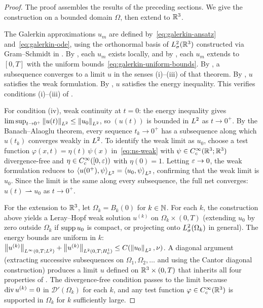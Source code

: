 \begin{proof}
  The proof assembles the results of the preceding sections.  We give the construction
  on a bounded domain $\Omega$, then extend to $\mathbb{R}^{3}$.

  The Galerkin approximations $u_{m}$ are defined by~\eqref{eq:galerkin-ansatz}
  and~\eqref{eq:galerkin-ode}, using the orthonormal basis of $L^{2}_\sigma(\mathbb{R}^{3})$
  constructed via Gram--Schmidt in .  By
  , each $u_{m}$ exists
  locally, and by , each $u_{m}$ extends to $[0, T]$ with the
  uniform bounds~\eqref{eq:galerkin-uniform-bounds}.  By
  , a subsequence converges to a limit $u$ in the
  senses (i)--(iii) of that theorem.  By , $u$ satisfies the weak
  formulation.  By , $u$ satisfies the energy inequality.
  This verifies conditions (i)--(iii) of .

  For condition (iv), weak continuity at $t = 0$: the energy inequality gives
  $\limsup_{t \to 0^{+}} \left\lVert u(t) \right\rVert_{L^{2}} \le \left\lVert u_{0} \right\rVert_{L^{2}}$, so $(u(t))$
  is bounded in $L^{2}$ as $t \to 0^{+}$.  By the Banach--Alaoglu theorem, every
  sequence $t_{k} \to 0^{+}$ has a subsequence along which $u(t_{k})$ converges weakly in
  $L^{2}$.  To identify the weak limit as $u_{0}$, choose a test function
  $\varphi(x, t) = \eta(t)\,\psi(x)$ in~\eqref{eq:ns-weak} with $\psi \in
  C^\infty_c(\mathbb{R}^{3}; \mathbb{R}^{3})$ divergence-free and $\eta \in C^\infty_c([0, \varepsilon))$ with
  $\eta(0) = 1$.  Letting $\varepsilon \to 0$, the weak formulation reduces to
  $\left\langle u(0^{+}), \psi \right\rangle_{L^{2}} = \left\langle u_{0}, \psi \right\rangle_{L^{2}}$, confirming that
  the weak limit is $u_{0}$.  Since the limit is the same along every subsequence, the
  full net converges: $u(t) \rightharpoonup u_{0}$ as $t \to 0^{+}$.

  For the extension to $\mathbb{R}^{3}$, let $\Omega_{k} = B_{k}(0)$ for $k \in \mathbb{N}$.  For each
  $k$, the construction above yields a Leray--Hopf weak solution $u^{(k)}$ on
  $\Omega_{k} \times (0, T)$ (extending $u_{0}$ by zero outside $\Omega_{k}$ if
  $\operatorname{supp} u_{0}$ is compact, or projecting onto $L^{2}_\sigma(\Omega_{k})$ in general).  The
  energy bounds are uniform in $k$:
  $\left\lVert u^{(k)} \right\rVert_{L^{\infty}(0,T;L^{2})} + \left\lVert u^{(k)} \right\rVert_{L^{2}(0,T;H^{1}_0)}
  \le C(\left\lVert u_{0} \right\rVert_{L^{2}}, \nu)$.  A diagonal argument (extracting successive
  subsequences on $\Omega_{1}, \Omega_{2}, \ldots$ and using the Cantor diagonal
  construction) produces a limit $u$ defined on $\mathbb{R}^{3} \times (0, T)$ that inherits all
  four properties of .  The divergence-free condition passes to the
  limit because $\operatorname{div} u^{(k)} = 0$ in $\mathcal{D}'(\Omega_{k})$ for each $k$,
  and any test function $\varphi \in C^\infty_c(\mathbb{R}^{3})$ is supported in $\Omega_{k}$ for
  $k$ sufficiently large.
\end{proof}

